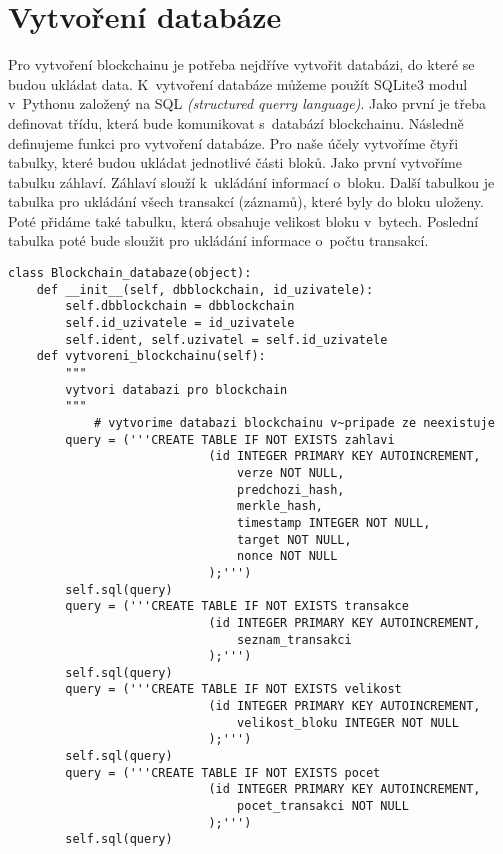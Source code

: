 \documentclass[12pt]{report}			%
\begin{document}
{{	\section{Vytvoření databáze}
Pro vytvoření blockchainu je potřeba nejdříve vytvořit databázi, do které se budou ukládat data. K~vytvoření databáze můžeme použít SQLite3 modul v~Pythonu založený na SQL \textit{(structured querry language)}. Jako první je třeba definovat třídu, která bude komunikovat s~databází blockchainu. Následně definujeme funkci pro vytvoření databáze. Pro naše účely vytvoříme čtyři tabulky, které budou ukládat jednotlivé části bloků. Jako první vytvoříme tabulku záhlaví. Záhlaví slouží k~ukládání informací o~bloku. Další tabulkou je tabulka pro ukládání všech transakcí (záznamů), které byly do bloku uloženy. Poté přidáme také tabulku, která obsahuje velikost bloku v~bytech. Poslední tabulka poté bude sloužit pro ukládání informace o~počtu transakcí.
}
\begin{lstlisting} 
class Blockchain_databaze(object):
    def __init__(self, dbblockchain, id_uzivatele):
        self.dbblockchain = dbblockchain
        self.id_uzivatele = id_uzivatele
        self.ident, self.uzivatel = self.id_uzivatele
    def vytvoreni_blockchainu(self):
        """
        vytvori databazi pro blockchain
        """
            # vytvorime databazi blockchainu v~pripade ze neexistuje
        query = ('''CREATE TABLE IF NOT EXISTS zahlavi
                            (id INTEGER PRIMARY KEY AUTOINCREMENT,
                                verze NOT NULL,
                                predchozi_hash,
                                merkle_hash,
                                timestamp INTEGER NOT NULL,
                                target NOT NULL,
                                nonce NOT NULL
                            );''')
        self.sql(query)
        query = ('''CREATE TABLE IF NOT EXISTS transakce
                            (id INTEGER PRIMARY KEY AUTOINCREMENT,
                                seznam_transakci
                            );''')
        self.sql(query)
        query = ('''CREATE TABLE IF NOT EXISTS velikost
                            (id INTEGER PRIMARY KEY AUTOINCREMENT,
                                velikost_bloku INTEGER NOT NULL
                            );''')
        self.sql(query)
        query = ('''CREATE TABLE IF NOT EXISTS pocet
                            (id INTEGER PRIMARY KEY AUTOINCREMENT,
                                pocet_transakci NOT NULL
                            );''')
        self.sql(query)
\end{lstlisting}

}
\end{document}
